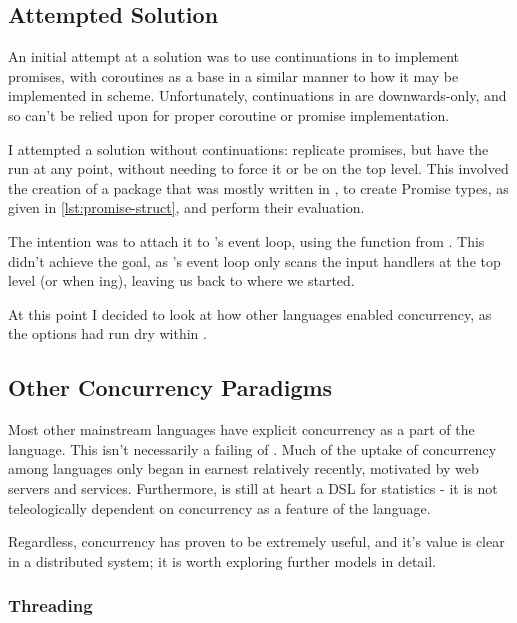 \subsection{Attempted Solution}

An initial attempt at a solution was to use continuations in \R to implement promises, with coroutines as a base in a similar manner to how it may be implemented in scheme.
Unfortunately, continuations in \R are downwards-only, and so can't be relied upon for proper coroutine or promise implementation.

I attempted a solution without continuations: replicate promises, but have the  run at any point, without needing to force it or be on the top level.
This involved the creation of a package that was mostly written in , to create Promise types, as given in \cref{lst:promise-struct}, and perform their evaluation.


The intention was to attach it to \R's event loop, using the  function from .
This didn't achieve the goal, as \R's event loop only scans the input handlers at the top level (or when ing), leaving us back to where we started.

At this point I decided to look at how other languages enabled concurrency, as the options had run dry within \R.

\subsection{Other Concurrency Paradigms}

Most other mainstream languages have explicit concurrency as a part of the language.
This isn't necessarily a failing of \R.
Much of the uptake of concurrency among languages only began in earnest relatively recently, motivated by web servers and services.
Furthermore, \R is still at heart a DSL for statistics - it is not teleologically dependent on concurrency as a feature of the language.

Regardless, concurrency has proven to be extremely useful, and it's value is clear in a distributed system;
it is worth exploring further models in detail.

\subsubsection{Threading}

